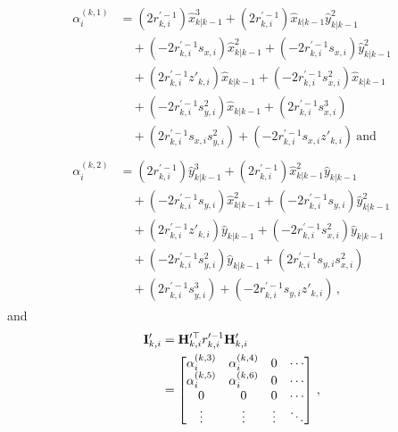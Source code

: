 \documentclass[10pt,letterpaper,oneside,twocolumn,journal]{IEEEtran}
\theoremstyle{definition}
\theoremstyle{definition}
\theoremstyle{remark}
\begin{document}
\begin{align*}
    \begin{split}
        \alpha_i^{(k,1)} &= (2r_{k,i}^{\prime-1})\hat{x}_{k|k-1}^3 + (2r_{k,i}^{\prime-1})\hat{x}_{k|k-1}\hat{y}_{k|k-1}^2 \\
        &\quad+ (-2r_{k,i}^{\prime-1}s_{x,i})\hat{x}_{k|k-1}^2 + (-2r_{k,i}^{\prime-1}s_{x,i})\hat{y}_{k|k-1}^2 \\
        &\quad+ (2r_{k,i}^{\prime-1}z'_{k,i})\hat{x}_{k|k-1} + (-2r_{k,i}^{\prime-1}s_{x,i}^2)\hat{x}_{k|k-1}\\
        &\quad+ (-2r_{k,i}^{\prime-1}s_{y,i}^2)\hat{x}_{k|k-1} + (2r_{k,i}^{\prime-1}s_{x,i}^3) \\
        &\quad+ (2r_{k,i}^{\prime-1}s_{x,i}s_{y,i}^2) + (-2r_{k,i}^{\prime-1}s_{x,i} z'_{k,i})\ \textrm{and}
    \end{split}\\
    \begin{split}
        \alpha_i^{(k,2)} &= (2r_{k,i}^{\prime-1})\hat{y}_{k|k-1}^3 + (2r_{k,i}^{\prime-1})\hat{x}_{k|k-1}^2\hat{y}_{k|k-1} \\
        &\quad+ (-2r_{k,i}^{\prime-1}s_{y,i})\hat{x}_{k|k-1}^2 + (-2r_{k,i}^{\prime-1}s_{y,i})\hat{y}_{k|k-1}^2 \\
        &\quad+ (2r_{k,i}^{\prime-1}z'_{k,i})\hat{y}_{k|k-1} + (-2r_{k,i}^{\prime-1}s_{x,i}^2)\hat{y}_{k|k-1} \\
        &\quad+ (-2r_{k,i}^{\prime-1}s_{y,i}^2)\hat{y}_{k|k-1} + (2r_{k,i}^{\prime-1}s_{y,i}s_{x,i}^2) \\
        &\quad+ (2r_{k,i}^{\prime-1}s_{y,i}^3) + (-2r_{k,i}^{\prime-1}s_{y,i}z'_{k,i})\,,
    \end{split}
\end{align*}
and
\begin{equation}
    \begin{split}
        \mat{I}'_{k,i} &= \mat{H}_{k,i}^{\prime\top} r_{k,i}^{\prime-1}\mat{H}'_{k,i} \\
        &=
        \begin{bmatrix}
            \alpha_i^{(k,3)} & \alpha_i^{(k,4)} & 0 & \cdots \\
            \alpha_i^{(k,5)} & \alpha_i^{(k,6)} & 0 & \cdots\\
            0 & 0 & 0 & \cdots \\
            \vdots & \vdots & \vdots & \ddots
        \end{bmatrix}\,,
    \end{split} \label{eqn:hrh_linear_comb}
\end{equation}
\end{document}
